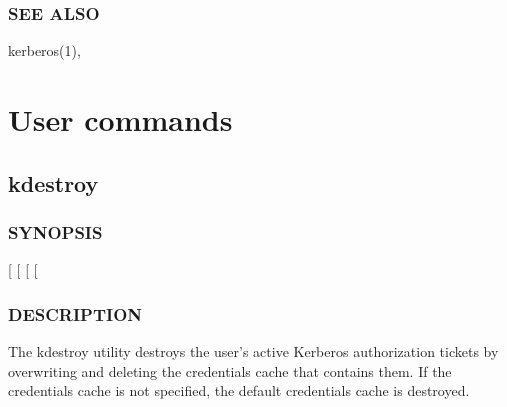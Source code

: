 \documentclass[letterpaper,10pt,english]{sphinxmanual}
\begin{document}
\subsection{SEE ALSO}
\label{\detokenize{user/user_config/k5identity:see-also}}
\sphinxAtStartPar
kerberos(1), 

\sphinxstepscope


\chapter{User commands}
\label{\detokenize{user/user_commands/index:user-commands}}\label{\detokenize{user/user_commands/index:id1}}\label{\detokenize{user/user_commands/index::doc}}
\sphinxstepscope


\section{kdestroy}
\label{\detokenize{user/user_commands/kdestroy:kdestroy}}\label{\detokenize{user/user_commands/kdestroy:kdestroy-1}}\label{\detokenize{user/user_commands/kdestroy::doc}}

\subsection{SYNOPSIS}
\label{\detokenize{user/user_commands/kdestroy:synopsis}}
\sphinxAtStartPar
{}
{[}\sphinxstylestrong{\sphinxhyphen{}A}{]}
{[}\sphinxstylestrong{\sphinxhyphen{}q}{]}
{[} \sphinxstyleemphasis{cache\_name}{]}
{[} \sphinxstyleemphasis{princ\_name}{]}


\subsection{DESCRIPTION}
\label{\detokenize{user/user_commands/kdestroy:description}}
\sphinxAtStartPar
The kdestroy utility destroys the user’s active Kerberos authorization
tickets by overwriting and deleting the credentials cache that
contains them.  If the credentials cache is not specified, the default
credentials cache is destroyed.
\end{document}
